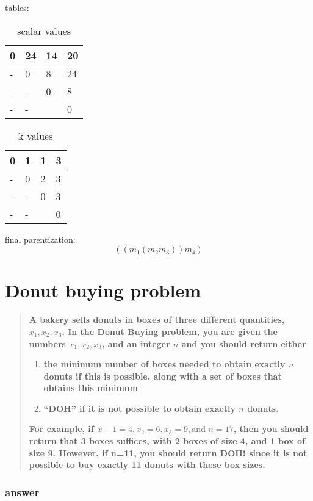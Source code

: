 \documentclass[titlepage]{article}\usepackage[]{graphicx}\usepackage[]{color}
\begin{document}
tables:
\begin{table}[h]
	\caption{scalar values}
	\label{tab:mylabel}
	\begin{tabular}{|l|l|l|l|}
		\hline
		0 & 24 & 14 & 20 \\ \hline
		- & 0  & 8  & 24 \\ \hline
		- & -  & 0  & 8  \\ \hline
		- & -  &    & 0  \\ \hline
	\end{tabular}
\end{table}

\begin{table}[h]
	\caption{k values}
	\label{tab:kval}
	\begin{tabular}{|l|l|l|l|}
		\hline
		0 & 1 & 1 & 3 \\ \hline
		- & 0  & 2  & 3 \\ \hline
		- & -  & 0  & 3  \\ \hline
		- & -  &    & 0  \\ \hline
	\end{tabular}
\end{table}

final parentization:
\[ \left( (m_1 (m_2 m_3)) m_4 \right)\]

\section{Donut buying problem}
\begin{quote}
	\textbf{A bakery sells donuts in boxes of three different quantities, $x_1, x_2,
		x_3$. In the Donut Buying problem, you are given the numbers $x_1, x_2,
		x_3$, and an integer $n$ and you should return either }
	\begin{enumerate}
		\item \textbf{the minimum number of boxes needed to obtain exactly $n$ donuts if
			this is possible, along with a set of boxes that obtains this minimum}
		\item \textbf{``DOH'' if it is not possible to obtain exactly $n$ donuts. }
	\end{enumerate}
	\textbf{For example, if $x+1 = 4, x_2 =6, x_3 = 9, \text{and } n=17$, then you should
	return that 3 boxes suffices, with 2 boxes of size 4, and 1 box of size 9.
	However, if n=11, you should return DOH! since it is not possible to buy
exactly 11 donuts with these box sizes. }
\end{quote}
\subsubsection{answer}
\end{document}
